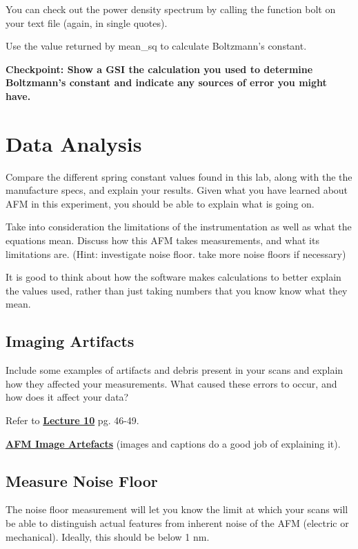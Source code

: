 \documentclass{../lab}
\begin{document}
You can check out the power density spectrum by calling the function bolt on your text file (again, in single quotes).

Use the value returned by mean\_sq to calculate Boltzmann's constant.

\textbf{Checkpoint: Show a GSI the calculation you used to determine Boltzmann's constant and indicate any sources of error you might have.}

\section{Data Analysis}

Compare the different spring constant values found in this lab, along with the the manufacture specs, and explain your results.  Given what you have learned about AFM in this experiment, you should be able to explain what is going on.

Take into consideration the limitations of the instrumentation as well as what the equations mean. Discuss how this AFM takes measurements, and what its limitations are. (Hint: investigate noise floor. take more noise floors if necessary)

It is good to think about how the software makes calculations to better explain the values used, rather than just taking numbers that you know know what they mean.

\subsection{Imaging Artifacts}

Include some examples of  artifacts and debris present in your scans and explain how they affected your measurements.  What caused these errors to occur, and how does it affect your data?

Refer to \href{http://experimentationlab.berkeley.edu/sites/default/files/AFMImages/Lecture\_10\_AFM.pdf}{\textbf{Lecture 10}}  pg. 46-49.

\href{http://experimentationlab.berkeley.edu/sites/default/files/AFMImages/AFM\_image\_artefacts.pdf}{\textbf{AFM Image Artefacts}} (images and captions do a good job of explaining it).

\subsection{Measure Noise Floor}
\label{subsec:MeasureNoiseFloor}

The noise floor measurement will let you know the limit at which your scans will be able to distinguish actual features from inherent noise of the AFM (electric or mechanical).  Ideally, this should be below 1 nm.
\end{document}
